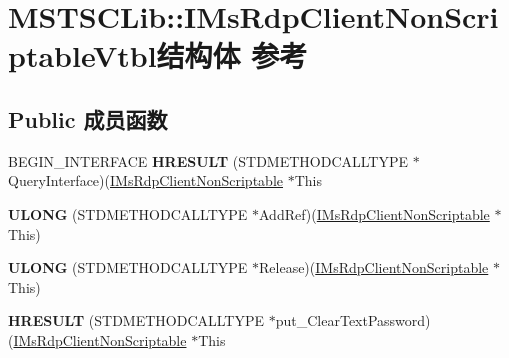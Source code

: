 \hypertarget{struct_m_s_t_s_c_lib_1_1_i_ms_rdp_client_non_scriptable_vtbl}{}\section{M\+S\+T\+S\+C\+Lib\+:\+:I\+Ms\+Rdp\+Client\+Non\+Scriptable\+Vtbl结构体 参考}
\label{struct_m_s_t_s_c_lib_1_1_i_ms_rdp_client_non_scriptable_vtbl}
\subsection*{Public 成员函数}
\begin{DoxyCompactItemize}
\item 
\mbox{\label{struct_m_s_t_s_c_lib_1_1_i_ms_rdp_client_non_scriptable_vtbl_a6f3a3cf40e09f675717992a070225481}} 
B\+E\+G\+I\+N\+\_\+\+I\+N\+T\+E\+R\+F\+A\+CE {\bfseries H\+R\+E\+S\+U\+LT} (S\+T\+D\+M\+E\+T\+H\+O\+D\+C\+A\+L\+L\+T\+Y\+PE $\ast$Query\+Interface)(\hyperlink{interface_m_s_t_s_c_lib_1_1_i_ms_rdp_client_non_scriptable}{I\+Ms\+Rdp\+Client\+Non\+Scriptable} $\ast$This
\item 
\mbox{\label{struct_m_s_t_s_c_lib_1_1_i_ms_rdp_client_non_scriptable_vtbl_aaf85759bc116a828ee519525749ef15e}} 
{\bfseries U\+L\+O\+NG} (S\+T\+D\+M\+E\+T\+H\+O\+D\+C\+A\+L\+L\+T\+Y\+PE $\ast$Add\+Ref)(\hyperlink{interface_m_s_t_s_c_lib_1_1_i_ms_rdp_client_non_scriptable}{I\+Ms\+Rdp\+Client\+Non\+Scriptable} $\ast$This)
\item 
\mbox{\label{struct_m_s_t_s_c_lib_1_1_i_ms_rdp_client_non_scriptable_vtbl_acfbada3afb99af32f9ef54b7b5f68456}} 
{\bfseries U\+L\+O\+NG} (S\+T\+D\+M\+E\+T\+H\+O\+D\+C\+A\+L\+L\+T\+Y\+PE $\ast$Release)(\hyperlink{interface_m_s_t_s_c_lib_1_1_i_ms_rdp_client_non_scriptable}{I\+Ms\+Rdp\+Client\+Non\+Scriptable} $\ast$This)
\item 
\mbox{\label{struct_m_s_t_s_c_lib_1_1_i_ms_rdp_client_non_scriptable_vtbl_a703aeb4d3299e22d86c6e95fe3cbd9d6}} 
{\bfseries H\+R\+E\+S\+U\+LT} (S\+T\+D\+M\+E\+T\+H\+O\+D\+C\+A\+L\+L\+T\+Y\+PE $\ast$put\+\_\+\+Clear\+Text\+Password)(\hyperlink{interface_m_s_t_s_c_lib_1_1_i_ms_rdp_client_non_scriptable}{I\+Ms\+Rdp\+Client\+Non\+Scriptable} $\ast$This

\end{DoxyCompactItemize}
